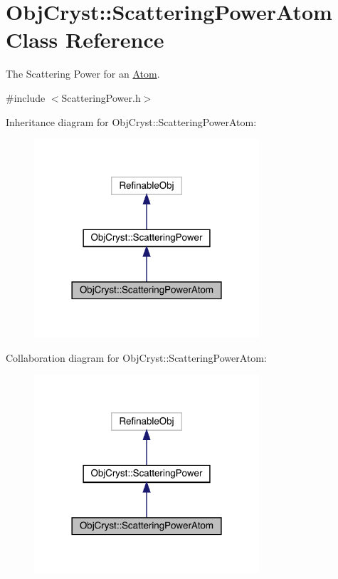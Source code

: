 \hypertarget{class_obj_cryst_1_1_scattering_power_atom}{}\section{Obj\+Cryst\+::Scattering\+Power\+Atom Class Reference}
\label{class_obj_cryst_1_1_scattering_power_atom}


The Scattering Power for an \mbox{\hyperlink{class_obj_cryst_1_1_atom}{Atom}}.  




{\ttfamily \#include $<$Scattering\+Power.\+h$>$}



Inheritance diagram for Obj\+Cryst\+::Scattering\+Power\+Atom\+:
\nopagebreak
\begin{figure}[H]
\begin{center}
\leavevmode
\includegraphics[width=237pt]{class_obj_cryst_1_1_scattering_power_atom__inherit__graph}
\end{center}
\end{figure}


Collaboration diagram for Obj\+Cryst\+::Scattering\+Power\+Atom\+:
\nopagebreak
\begin{figure}[H]
\begin{center}
\leavevmode
\includegraphics[width=237pt]{class_obj_cryst_1_1_scattering_power_atom__coll__graph}
\end{center}
\end{figure}
